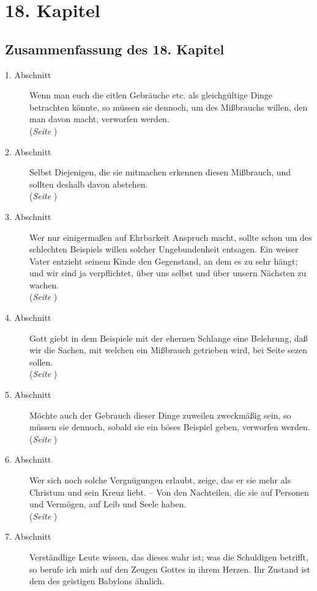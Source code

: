
\chapter{18. Kapitel} \label{kap18}
\section{Zusammenfassung des 18. Kapitel}

\begin{description}
\item[1. Abschnitt] Wenn man euch die eitlen Gebräuche etc. als gleichgültige
Dinge betrachten könnte, so müssen sie dennoch, um des Mißbrauchs willen, den
man davon macht, verworfen werden.
\\(\textit{Seite \pageref{kap18_ab1}})
\item[2. Abschnitt] Selbst Diejenigen, die sie mitmachen erkennen diesen
Mißbrauch, und sollten deshalb davon abstehen.
\\(\textit{Seite \pageref{kap18_ab2}})
\item[3. Abschnitt] Wer nur einigermaßen auf Ehrbarkeit Anspruch macht, sollte
schon um des schlechten Beispiels willen solcher Ungebundenheit entsagen. Ein
weiser Vater entzieht seinem Kinde den Gegenstand, an dem es zu sehr hängt; und
wir sind ja verpflichtet, über uns selbst und über unsern Nächsten zu wachen.
\\(\textit{Seite \pageref{kap18_ab3}})
\item[4. Abschnitt] Gott giebt in dem Beispiele mit der ehernen Schlange eine
Belehrung, daß wir die Sachen, mit welchen ein Mißbrauch getrieben wird, bei
Seite sezen sollen.
\\(\textit{Seite \pageref{kap18_ab4}})
\item[5. Abschnitt] Möchte auch der Gebrauch dieser Dinge zuweilen zweckmäßig
sein, so müssen sie dennoch, sobald sie ein böses Beispiel geben, verworfen
werden.
\\(\textit{Seite \pageref{kap18_ab5}})
\item[6. Abschnitt] Wer sich noch solche Vergnügungen erlaubt, zeige, das er sie
mehr als Christum und sein Kreuz liebt. -- Von den Nachteilen, die sie auf
Personen und Vermögen, auf Leib und Seele haben.
\\(\textit{Seite \pageref{kap18_ab6}})
\item[7. Abschnitt] Verständlige Leute wissen, das dieses wahr ist; was die
Schuldigen betrifft, so berufe ich mich auf den Zeugen Gottes in ihrem Herzen.
Ihr Zustand ist dem des geistigen Babylons ähnlich.

\end{description}
